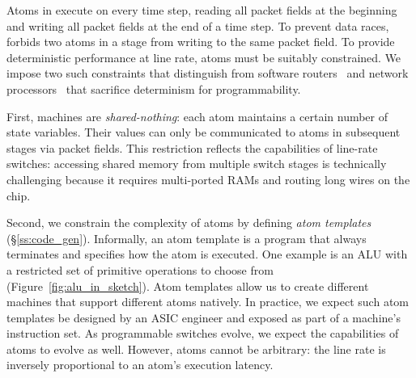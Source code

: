 
Atoms in \absmachine execute on every time step, reading all packet fields at
the beginning and writing all packet fields at the end of a time step. To
prevent data races, \absmachine forbids two atoms in a stage from writing to
the same packet field.  To provide deterministic performance at line rate,
atoms must be suitably constrained.  We impose two such constraints that
distinguish \absmachine from software routers~\cite{click} and network
processors~\cite{ixp4xx} that sacrifice determinism for programmability.

First, \absmachine machines are \textit{shared-nothing}: each atom maintains a
certain number of state variables.  Their values can only be communicated to
atoms in subsequent stages via packet fields. This restriction reflects the
capabilities of line-rate switches: accessing shared memory from multiple
switch stages is technically challenging because it requires multi-ported RAMs
and routing long wires on the chip.

Second, we constrain the complexity of atoms by defining {\it atom templates}
(\S\ref{ss:code_gen}).  Informally, an atom template is a program that always
terminates and specifies how the atom is executed. One example is an ALU with a
restricted set of primitive operations to choose from
(Figure~\ref{fig:alu_in_sketch}). Atom templates allow us to create different
\absmachine machines that support different atoms natively. In practice, we
expect such atom templates be designed by an ASIC engineer and exposed as part
of a \absmachine machine's instruction set. As programmable switches evolve, we
expect the capabilities of atoms to evolve as well. However, atoms cannot be
arbitrary: the line rate is inversely proportional to an atom's execution
latency.
